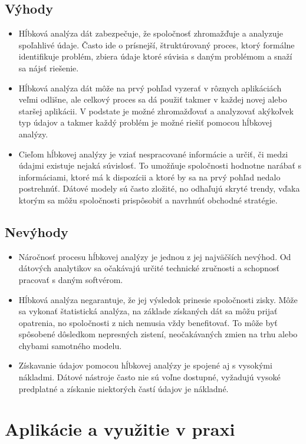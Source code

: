 \documentclass[10pt,twoside,slovak,a4paper]{article}
\begin{document}
\subsection{Výhody}
\begin{itemize}
\item Hĺbková analýza dát zabezpečuje, že spoločnosť zhromažďuje a analyzuje spoľahlivé údaje. Často ide o prísnejší, štruktúrovaný proces, ktorý formálne identifikuje problém, zbiera údaje ktoré súvisia s daným problémom a snaží sa nájsť riešenie.\cite{LunaCamp}
\item Hĺbková analýza dát môže na prvý pohľad vyzerať v rôznych aplikáciách veľmi odlišne, ale celkový proces sa dá použiť takmer v každej novej alebo staršej aplikácii. V podstate je možné zhromažďovať a analyzovať akýkoľvek typ údajov a takmer každý problém je možné riešiť pomocou hĺbkovej analýzy.
\item Cieľom hĺbkovej analýzy je vziať nespracované informácie a určiť, či medzi údajmi existuje nejaká súvislosť. To umožňuje spoločnosti hodnotne narábať s  informáciami, ktoré má k dispozícii a ktoré by sa na prvý pohľad nedalo postrehnúť. Dátové modely sú často zložité, no odhaľujú skryté trendy, vďaka ktorým sa môžu spoločnosti prispôsobiť a navrhnúť obchodné stratégie.\cite{AlexandraTwin}
\end{itemize}
\subsection{Nevýhody}
\begin{itemize}
\item Náročnosť procesu hĺbkovej analýzy je jednou z jej najväčších nevýhod. Od dátových analytikov sa očakávajú určité technické zručnosti a schopnosť pracovať s daným softvérom. 
\item Hĺbková analýza negarantuje, že jej výsledok prinesie spoločnosti zisky. Môže sa vykonať štatistická analýza, na základe získaných dát sa môžu prijať opatrenia, no spoločnosti z nich nemusia vždy benefitovať. To môže byť spôsobené dôsledkom nepresných zistení, neočakávaných zmien na trhu alebo chybami samotného modelu.
\item Získavanie údajov pomocou hĺbkovej analýzy je spojené aj s vysokými nákladmi. Dátové nástroje často nie sú voľne dostupné, vyžadujú vysoké predplatné a získanie niektorých častí údajov je nákladné.\cite{AlexandraTwin}
\end{itemize}


\section{Aplikácie a využitie v praxi}





\end{document}

